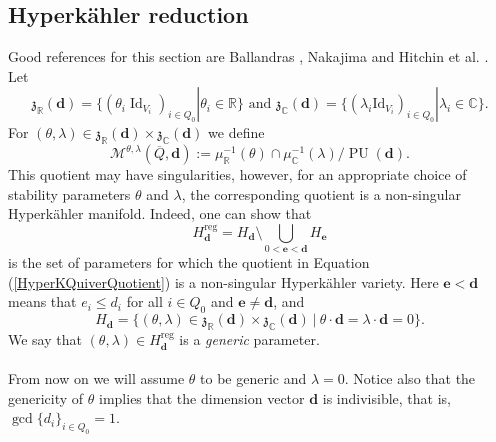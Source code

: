 \documentclass{amsart}
\theoremstyle{plain}
\numberwithin{equation}{section}
\theoremstyle{definition}
\theoremstyle{remark}
\begin{document}
	\subsection{Hyperkähler reduction}\label{hyperKReduction}
	Good references for this section are Ballandras \cite{BallandrasTrivializations}, Nakajima \cite{Nakajima} and Hitchin et al. \cite{HitchinHyperK}. Let 
	$$
	\mathfrak{z}_{\mathbb{R}}(\mathbf{d})=\{(\theta_{i}\operatorname{Id}_{V_i})_{i\in Q_0}|\theta_i\in \mathbb{R}\} \text{ and } \mathfrak{z}_{\mathbb{C}}(\mathbf{d})=\{(\lambda_i \text{Id}_{V_i})_{i\in Q_0}|\lambda_i\in\mathbb{C}\}.
	$$
	For $(\theta,\lambda)\in \mathfrak{z}_{\mathbb{R}}(\mathbf{d})\times\mathfrak{z}_{\mathbb{C}}(\mathbf{d})$
	we define
	\begin{equation}\label{HyperKQuiverQuotient}
		\mathcal{M}^{\theta,\lambda}(\overline{Q},\mathbf{d}):=\mu_{\mathbb{R}}^{-1}(\theta)\cap\mu^{-1}_{\mathbb{C}}(\lambda)/\operatorname{PU}(\mathbf{d}).
	\end{equation}
	This quotient may have singularities, however, for an appropriate choice of stability parameters $\theta$ and $\lambda$, the corresponding quotient is a non-singular Hyperkähler manifold. Indeed, one can show that
	$$
	H_\mathbf{d}^{\text{reg}}=H_{\mathbf{d}}\setminus\bigcup_{0<\mathbf{e}<\mathbf{d}}H_{\mathbf{e}}
	$$
	is the set of parameters for which the quotient in Equation (\ref{HyperKQuiverQuotient}) is a non-singular Hyperkähler variety. Here $\mathbf{e}<\mathbf{d}$ means that $e_i\leq d_i$ for all $i\in Q_0$ and $\mathbf{e}\neq \mathbf{d}$, and 
	$$
	H_{\mathbf{d}}=\{(\theta,\lambda)\in \mathfrak{z}_{\mathbb{R}}(\mathbf{d})\times\mathfrak{z}_{\mathbb{C}}(\mathbf{d})\ | \ \theta\cdot\mathbf{d}=\lambda\cdot \mathbf{d}=0\}.
	$$
	We say that $(\theta,\lambda)\in H_\mathbf{d}^{\text{reg}}$ is a \emph{generic} parameter. 
	\\
	\\
	From now on we will assume $\theta$ to be generic and $\lambda=0$. Notice also that the genericity of $\theta$ implies that the dimension vector $\mathbf{d}$ is indivisible, that is, $\operatorname{gcd}\{d_i\}_{i\in Q_0}=1$.
\end{document}
